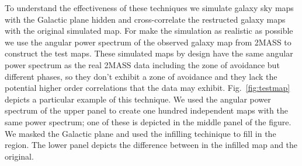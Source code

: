 \documentclass[useAMS,usenatbib]{mn2e}
\begin{document}
To understand the effectiveness of these techniques we simulate galaxy
sky maps with the Galactic plane hidden and cross-correlate the
restructed galaxy maps with the original simulated map.  For make the
simulation as realistic as possible we use the angular power spectrum
of the observed galaxy map from 2MASS to construct the test maps.
These simulated maps by design have the same angular power spectrum as
the real 2MASS data including the zone of avoidance but different
phases, so they don't exhibit a zone of avoidance and they lack the
potential higher order correlations that the data may exhibit.
Fig.~\ref{fig:testmap} depicts a particular example of this technique.
We used the angular power spectrum of the upper panel to create one
hundred independent maps with the same power spectrum; one of these is
depicted in the middle panel of the figure.  We masked the Galactic
plane and used the infilling techinique to fill in the region.  The
lower panel depicts the difference between in the infilled map and the
original.
\end{document}
